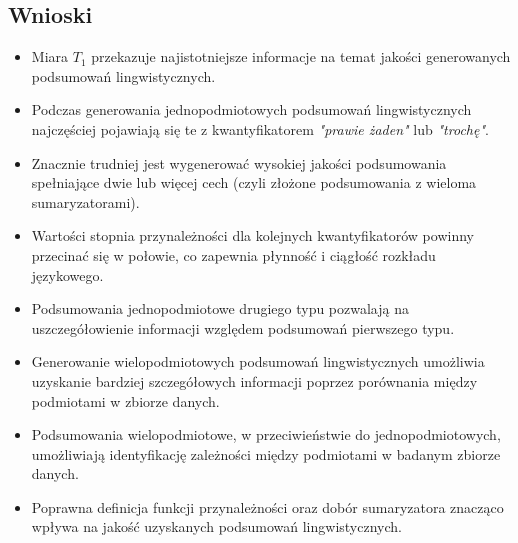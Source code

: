 \documentclass{article}
\begin{document}
\subsection{Wnioski}
\begin{itemize}
    \item Miara \(T_1\) przekazuje najistotniejsze informacje na temat jakości generowanych podsumowań lingwistycznych. 

    \item Podczas generowania jednopodmiotowych podsumowań lingwistycznych najczęściej pojawiają się te z kwantyfikatorem \textit{"prawie żaden"} lub \textit{"trochę"}.

    \item Znacznie trudniej jest wygenerować wysokiej jakości podsumowania spełniające dwie lub więcej cech (czyli złożone podsumowania z wieloma sumaryzatorami).

    \item Wartości stopnia przynależności dla kolejnych kwantyfikatorów powinny przecinać się w połowie, co zapewnia płynność i ciągłość rozkładu językowego.

    \item Podsumowania jednopodmiotowe drugiego typu pozwalają na uszczegółowienie informacji względem podsumowań pierwszego typu.

    \item Generowanie wielopodmiotowych podsumowań lingwistycznych umożliwia uzyskanie bardziej szczegółowych informacji poprzez porównania między podmiotami w zbiorze danych.

    \item Podsumowania wielopodmiotowe, w przeciwieństwie do jednopodmiotowych, umożliwiają identyfikację zależności między podmiotami w badanym zbiorze danych.

    \item Poprawna definicja funkcji przynależności oraz dobór sumaryzatora znacząco wpływa na jakość uzyskanych podsumowań lingwistycznych.
\end{itemize}
\end{document}
